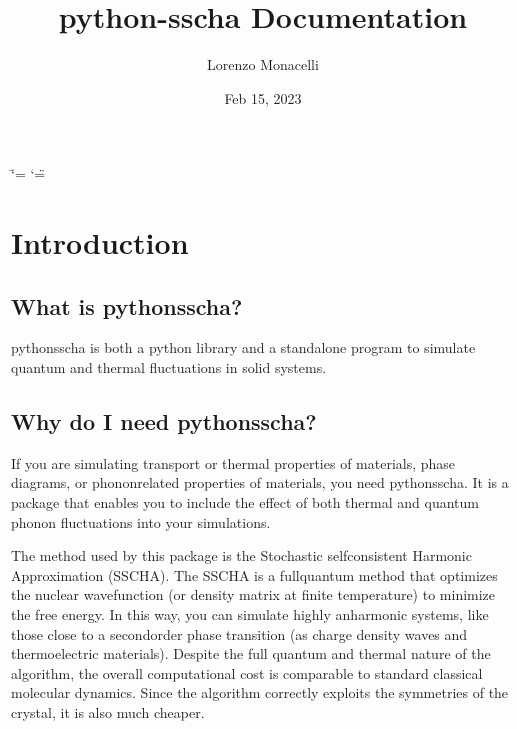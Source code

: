 \documentclass[a4paper,11pt,english]{sphinxmanual}
\title{python-sscha Documentation}
\date{Feb 15, 2023}
\author{Lorenzo Monacelli}
\begin{document}
\ifdefined\shorthandoff
  \ifnum\catcode`\=\string=\active\shorthandoff{=}\fi
  \ifnum\catcode`\"=\active{}\fi
\fi

\pagestyle{empty}
\sphinxmaketitle
\pagestyle{plain}
\sphinxtableofcontents
\pagestyle{normal}
\label{\detokenize{index1::doc}}


\sphinxstepscope


\chapter{Introduction}
\label{\detokenize{intro:introduction}}\label{\detokenize{intro::doc}}

\section{What is python\sphinxhyphen{}sscha?}
\label{\detokenize{intro:what-is-python-sscha}}
\sphinxAtStartPar
python\sphinxhyphen{}sscha is both a python library and a stand\sphinxhyphen{}alone program to simulate quantum and thermal fluctuations in solid systems.


\section{Why do I need python\sphinxhyphen{}sscha?}
\label{\detokenize{intro:why-do-i-need-python-sscha}}
\sphinxAtStartPar
If you are simulating transport or thermal properties of materials, phase diagrams, or phonon\sphinxhyphen{}related properties of materials, you need python\sphinxhyphen{}sscha.
It is a package that enables you to include the effect of both thermal and quantum phonon fluctuations into your  simulations.

\sphinxAtStartPar
The method used by this package is the  Stochastic self\sphinxhyphen{}consistent Harmonic Approximation (SSCHA). The SSCHA is a full\sphinxhyphen{}quantum method that optimizes the nuclear wave\sphinxhyphen{}function (or density matrix at finite temperature) to minimize the free energy.
In this way, you can simulate highly anharmonic systems, like those close to a second\sphinxhyphen{}order phase transition (as charge density waves and thermoelectric materials).
Despite the full quantum and thermal nature of the algorithm, the overall computational cost is comparable to standard classical molecular dynamics. Since the algorithm correctly exploits the symmetries of the crystal, it is also much cheaper.
\end{document}
